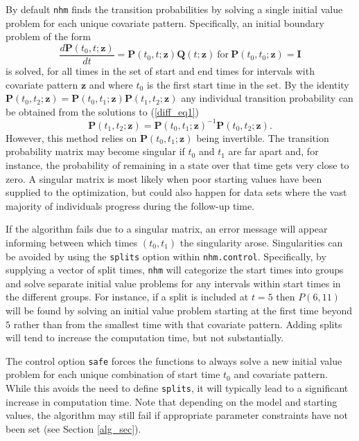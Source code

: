 \documentclass{article}
\numberwithin{equation}{section}
\begin{document}
By default \verb!nhm! finds the transition probabilities by solving a single initial value problem for each unique covariate pattern. Specifically, an initial boundary problem of the form
\begin{equation}\frac{d\mathbf{P}(t_0, t ; \mathbf{z})}{dt} = \mathbf{P}(t_0,t ; \mathbf{z})\mathbf{Q}(t ;  \mathbf{z}) ~ \mbox{for}  ~ \mathbf{P}(t_0,t_0 ; \mathbf{z}) = \mathbf{I} \label{diff_eq1} \end{equation}
is solved, for all times in the set of start and end times for intervals with covariate pattern $\mathbf{z}$ and where $t_0$ is the first start time in the set.
By the identity $\mathbf{P}(t_0 , t_2; \mathbf{z}) = \mathbf{P}(t_0 , t_1; \mathbf{z})\mathbf{P}(t_1 , t_2; \mathbf{z})$ any individual transition probability can be obtained from the solutions to (\ref{diff_eq1})
$$\mathbf{P}(t_1 , t_2; \mathbf{z}) = \mathbf{P}(t_0 , t_1; \mathbf{z})^{-1}\mathbf{P}(t_0 , t_2; \mathbf{z}).$$
However, this method relies on $\mathbf{P}(t_0 , t_1; \mathbf{z})$ being invertible. The transition probability matrix may become singular if $t_0$ and $t_1$ are far apart and, for instance, the probability of remaining in a state over that time gets very close to zero. A singular matrix is most likely when poor starting values have been supplied to the optimization, but could also happen for data sets where the vast majority of individuals progress during the follow-up time.

If the algorithm fails due to a singular matrix, an error message will appear informing between which times $(t_0, t_1)$ the singularity arose. Singularities can be avoided by using the \verb!splits! option within \verb!nhm.control!. Specifically, by supplying a vector of split times, \verb!nhm! will categorize the start times into groups and solve separate initial value problems for any intervals within start times in the different groups. For instance, if a split is included at $t=5$ then $P(6,11)$ will be found by solving an initial value problem starting at the first time beyond $5$ rather than from the smallest time with that covariate pattern. Adding splits will tend to increase the computation time, but not substantially. 

The control option \verb!safe! forces the functions to always solve a new initial value problem for each unique combination of start time $t_0$ and covariate pattern. While this avoids the need to define \verb!splits!, it will typically lead to a significant increase in computation time. Note that depending on the model and starting values, the algorithm may still fail if appropriate parameter constraints have not been set (see Section \ref{alg_sec}).
\end{document}
